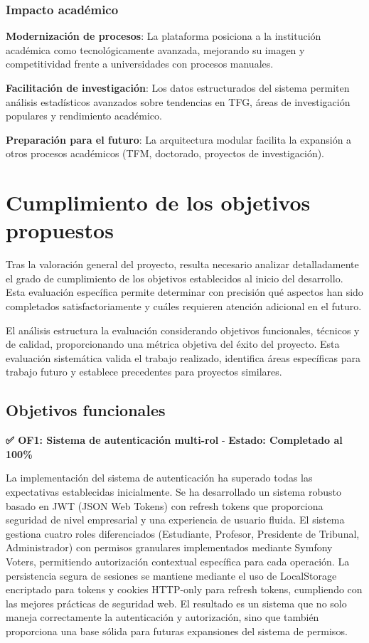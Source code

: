 \documentclass[12pt,a4paper,oneside]{report}
\begin{document}
\subsubsection{Impacto académico}\label{impacto-acaduxe9mico}

\textbf{Modernización de procesos}: La plataforma posiciona a la
institución académica como tecnológicamente avanzada, mejorando su
imagen y competitividad frente a universidades con procesos manuales.

\textbf{Facilitación de investigación}: Los datos estructurados del sistema permiten análisis estadísticos avanzados sobre tendencias en TFG, áreas de investigación populares y rendimiento académico.

\textbf{Preparación para el futuro}: La arquitectura modular facilita la
expansión a otros procesos académicos (TFM, doctorado, proyectos de
investigación).

\section{Cumplimiento de los objetivos
propuestos}\label{cumplimiento-de-los-objetivos-propuestos}

Tras la valoración general del proyecto, resulta necesario analizar detalladamente el grado de cumplimiento de los objetivos establecidos al inicio del desarrollo. Esta evaluación específica permite determinar con precisión qué aspectos han sido completados satisfactoriamente y cuáles requieren atención adicional en el futuro.

El análisis estructura la evaluación considerando objetivos funcionales, técnicos y de calidad, proporcionando una métrica objetiva del éxito del proyecto. Esta evaluación sistemática valida el trabajo realizado, identifica áreas específicas para trabajo futuro y establece precedentes para proyectos similares.

\subsection{Objetivos funcionales}\label{objetivos-funcionales}

\textbf{✅ OF1: Sistema de autenticación multi-rol} - \textbf{Estado: Completado al 100\%}

La implementación del sistema de autenticación ha superado todas las expectativas establecidas inicialmente. Se ha desarrollado un sistema robusto basado en JWT (JSON Web Tokens) con refresh tokens que proporciona seguridad de nivel empresarial y una experiencia de usuario fluida. El sistema gestiona cuatro roles diferenciados (Estudiante, Profesor, Presidente de Tribunal, Administrador) con permisos granulares implementados mediante Symfony Voters, permitiendo autorización contextual específica para cada operación. La persistencia segura de sesiones se mantiene mediante el uso de LocalStorage encriptado para tokens y cookies HTTP-only para refresh tokens, cumpliendo con las mejores prácticas de seguridad web. El resultado es un sistema que no solo maneja correctamente la autenticación y autorización, sino que también proporciona una base sólida para futuras expansiones del sistema de permisos.
\end{document}
